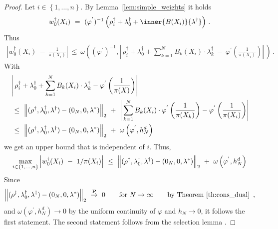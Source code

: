 \begin{proof}
  Let $i\in \left\{ 1,\ldots,n \right\}$.
  By Lemma~\ref{lem:simple_weights}
  it holds
  \begin{align*}
    w_0^\dagger(X_i)
    \ 
    =
    \ 
      (\varphi^{'})^{-1}
      \left( 
        \rho_i^\dagger
        +
        \lambda_0^\dagger
        +
        \inner{B(X_i)}{\lambda^\dagger}
      \right)
      \,.
  \end{align*}
  Thus
  \begin{align}
    \label{4445}
    \left| 
    w_0^\dagger(X_i)
    \ 
    -
    \ 
    \frac{1}{\pi(X_i)}
    \right|
    \
    \le
    \
    \omega
    \left( 
      (\varphi^{'})^{-1}
      ,
      \left| 
      \,
      \rho_i^\dagger
      +
      \lambda_0^\dagger
      +
      \sum_{k=1}^{N} 
      B_k(X_i)\cdot\lambda_k^\dagger
      \ 
      -
      \ 
      \varphi^{'}
      \left( \frac{1}{\pi(X_i)} \right)
      \right|
      \,
    \right)
    \,.
  \end{align}
  With
  \begin{align*}
      &
      \left| 
      \,
      \rho_i^\dagger
      +
      \lambda_0^\dagger
      +
      \sum_{k=1}^{N} 
      B_k(X_i)\cdot\lambda_k^\dagger-
      \varphi^{'}
      \left( \frac{1}{\pi(X)} \right)
      \right|
      \\
      &
      \ 
      \le
      \ 
      \norm{
        (\rho^\dagger,\lambda_0^\dagger,\lambda^\dagger)
        -
        (0_N,0,\lambda^*)
      }_2
      \ 
      +
      \ 
      \left| 
      \,
      \sum_{k=1}^{N} 
      B_k(X_i)\cdot
      \varphi^{'}
      \left( \frac{1}{\pi(X_k)} \right)
      -
      \varphi^{'}
      \left( \frac{1}{\pi(X_i)} \right)
      \right|
      \\
      &
      \ 
      \le
      \ 
      \norm{
        (\rho^\dagger,\lambda_0^\dagger,\lambda^\dagger)
        -
        (0_N,0,\lambda^*)
      }_2
      \ 
      +
      \ 
      \omega
      \left( 
        \varphi^{'},
        h_N^d
      \right)
  \end{align*}
  we get an upper bound that is independent of $i$.
  Thus,
  \begin{align*}
    \max_{i\in \left\{ 1,\ldots,n \right\}}
    \left| 
  w_0^\dagger(X_i)
  \ 
  -
  \ 
  1/\pi(X_i)
    \right|
      \ 
      \le
      \ 
      \norm{
        (\rho^\dagger,\lambda_0^\dagger,\lambda^\dagger)
        -
        (0_N,0,\lambda^*)
      }_2
      \ 
      +
      \ 
      \omega
      \left( 
        \varphi^{'},
        h_N^d
      \right)
  \end{align*}
  Since
  \begin{align*}
      \norm{
        (\rho^\dagger,\lambda_0^\dagger,\lambda^\dagger)
        -
        (0_N,0,\lambda^*)
      }_2
      \ 
      \overset{\P}{\to}
      \ 
      0
      \qquad
      \text{for}
      \ 
      N\to\infty
      \qquad
      \text{by Theorem~\ref{th:cons_dual}
      }
      \,,
  \end{align*}
  and $\omega(\varphi^{'},h_N^d)\to 0$ by the uniform continuity of $\varphi$ and $h_N\to 0$, 
  it follows the first statement.
The second statement follows from the selection lemma
\cite[A.1.4.]{Steinwart2008}.
  \end{proof}
